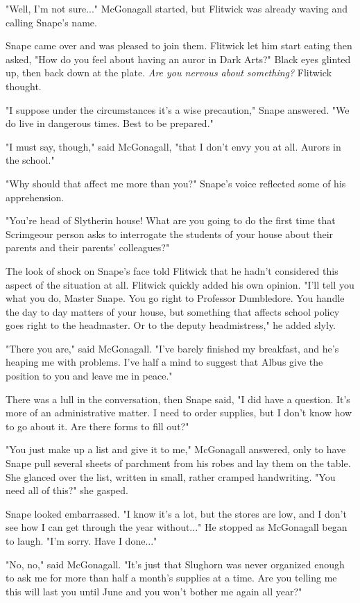 "Well, I'm not sure..." McGonagall started, but Flitwick was already waving and calling Snape's name.

Snape came over and was pleased to join them. Flitwick let him start eating then asked, "How do you feel about having an auror in Dark Arts?" Black eyes glinted up, then back down at the plate. \emph{Are you nervous about something?} Flitwick thought.

"I suppose under the circumstances it's a wise precaution," Snape answered. "We do live in dangerous times. Best to be prepared."

"I must say, though," said McGonagall, "that I don't envy you at all. Aurors in the school."

"Why should that affect me more than you?" Snape's voice reflected some of his apprehension.

"You're head of Slytherin house! What are you going to do the first time that Scrimgeour person asks to interrogate the students of your house about their parents and their parents' colleagues?"

The look of shock on Snape's face told Flitwick that he hadn't considered this aspect of the situation at all. Flitwick quickly added his own opinion. "I'll tell you what you do, Master Snape. You go right to Professor Dumbledore. You handle the day to day matters of your house, but something that affects school policy goes right to the headmaster. Or to the deputy headmistress," he added slyly.

"There you are," said McGonagall. "I've barely finished my breakfast, and he's heaping me with problems. I've half a mind to suggest that Albus give the position to you and leave me in peace."

There was a lull in the conversation, then Snape said, "I did have a question. It's more of an administrative matter. I need to order supplies, but I don't know how to go about it. Are there forms to fill out?"

"You just make up a list and give it to me," McGonagall answered, only to have Snape pull several sheets of parchment from his robes and lay them on the table. She glanced over the list, written in small, rather cramped handwriting. "You need all of this?" she gasped.

Snape looked embarrassed. "I know it's a lot, but the stores are low, and I don't see how I can get through the year without..." He stopped as McGonagall began to laugh. "I'm sorry. Have I done..."

"No, no," said McGonagall. "It's just that Slughorn was never organized enough to ask me for more than half a month's supplies at a time. Are you telling me this will last you until June and you won't bother me again all year?"

